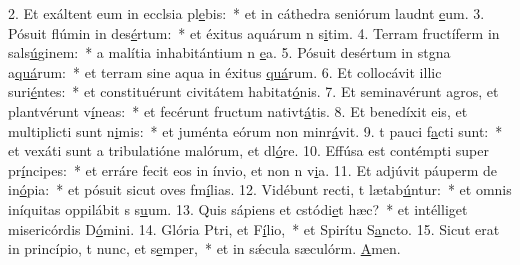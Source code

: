 2. Et exáltent eum in ecclsia pl\uline{e}bis:~* et in cáthedra seniórum laudnt \uline{e}um.
3. Pósuit flúmin in des\uline{é}rtum:~* et éxitus aquárum n s\uline{i}tim.
4. Terram fructíferm in sals\uline{ú}ginem:~* a malítia inhabitántium n \uline{e}a.
5. Pósuit desértum in stgna a\uline{quá}rum:~* et terram sine aqua in éxitus \uline{quá}rum.
6. Et collocávit illic suri\uline{é}ntes:~* et constituérunt civitátem habitat\uline{ó}nis.
7. Et seminavérunt agros, et plantvérunt v\uline{í}neas:~* et fecérunt fructum nativt\uline{á}tis.
8. Et benedíxit eis, et multiplicti sunt n\uline{i}mis:~* et juménta eórum non minr\uline{á}vit.
9. t pauci f\uline{a}cti sunt:~* et vexáti sunt a tribulatióne malórum, et dl\uline{ó}re.
10. Effúsa est contémpti super pr\uline{í}ncipes:~* et erráre fecit eos in ínvio, et non n v\uline{i}a.
11. Et adjúvit páuperm de in\uline{ó}pia:~* et pósuit sicut oves fm\uline{í}lias.
12. Vidébunt recti, t lætab\uline{ú}ntur:~* et omnis iníquitas oppilábit s s\uline{u}um.
13. Quis sápiens et cstódi\uline{e}t hæc?~* et intélliget misericórdis D\uline{ó}mini.
14. Glória Ptri, et F\uline{í}lio,~* et Spirítu S\uline{a}ncto.
15. Sicut erat in princípio, t nunc, et s\uline{e}mper,~* et in sǽcula sæculórm. \uline{A}men.
